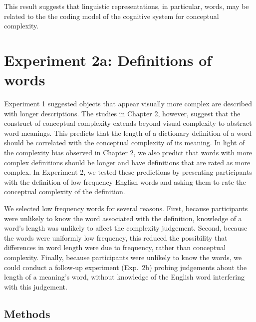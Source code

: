 This result suggests that linguistic representations, in particular, words, may be related to the the coding model of the cognitive system for conceptual complexity.

\section{Experiment 2a: Definitions of words}
Experiment 1 suggested objects that appear visually more complex are described with longer descriptions. The studies in Chapter 2, however, suggest that the construct of conceptual complexity extends beyond visual complexity to abstract word meanings. This predicts that the length of a dictionary definition of a word should be correlated with the conceptual complexity of its meaning. In light of the complexity bias observed in Chapter 2, we also predict that words with more complex definitions should be longer and have definitions that are rated as more complex. In Experiment 2, we tested these predictions by presenting participants with the definition of low frequency English words  and asking them to rate the conceptual complexity of the definition.

We selected low frequency words for several reasons. First, because participants were unlikely to know the word associated with the definition, knowledge of a word's length was unlikely to affect the complexity judgement. Second, because the words were uniformly low frequency, this reduced the possibility that differences in word length were due to frequency, rather than conceptual complexity. Finally, because participants were unlikely to know the words, we could conduct a follow-up experiment (Exp.\ 2b) probing judgements about the length of a meaning's word, without knowledge of the English word interfering with this judgement.

\subsection{Methods}



